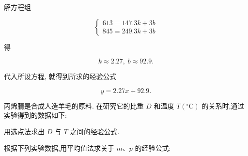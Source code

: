 \documentclass[lang=cn,newtx,10pt,scheme=chinese]{elegantbook}
\begin{document}
解方程组

\[
  \left\{ \begin{array}{l} {613} = {147.3k} + {3b} \\ {845} = {249.3k} + {3b} \end{array}\right.
\]

得

\[
  k \approx {2.27},\;b \approx {92.9}.
\]

代入所设方程, 就得到所求的经验公式

\[
  y = {2.27x} + {92.9}.
\]

\begin{problemset}[练习]

\item 丙烯腈是合成人造羊毛的原料. 在研究它的比重 \(D\) 和温度 \(T\left( {{}^{ \circ }\mathrm{C}}\right)\) 的关系时,通过实验得到的数据如下:

\begin{center}
\end{center}

用选点法求出 \(D\) 与 \(T\) 之间的经验公式.

\item 根据下列实验数据,用平均值法求关于 \(m\text{、}p\) 的经验公式:

\begin{center}
\end{center}

\end{problemset}
\end{document}
